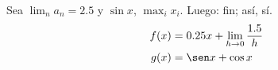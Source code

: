 \documentclass{article}
\begin{document}
Sea $\lim_{n} a_n = 2.5$ y $\sin x$, $\max_{i} x_i$. Luego: fin; así, sí.
\begin{align}
f(x) &= 0.25 x + \lim_{h \to 0} \frac{1.5}{h} \\
g(x) &= \sen x + \cos x
\end{align}
\end{document}
